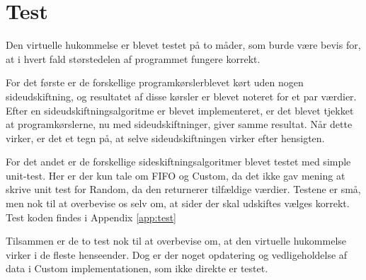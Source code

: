 \section{Test}
Den virtuelle hukommelse er blevet testet på to måder, som burde være bevis for, at i hvert fald størstedelen af programmet fungere korrekt.

For det første er de forskellige programkørslerblevet kørt uden nogen sideudskiftning, og resultatet af disse kørsler er blevet noteret for et par værdier. Efter en sideudskiftningsalgoritme er blevet implementeret, er det blevet tjekket at programkørslerne, nu med sideudskiftninger, giver samme resultat. Når dette virker, er det et tegn på, at selve sideudskiftningen virker efter hensigten.

For det andet er de forskellige sideskiftningsalgoritmer blevet testet med simple unit-test. Her er der kun tale om FIFO og Custom, da det ikke gav mening at skrive unit test for Random, da den returnerer tilfældige værdier. Testene er små, men nok til at overbevise os selv om, at sider der skal udskiftes vælges korrekt. Test koden findes i Appendix \ref{app:test}

Tilsammen er de to test nok til at overbevise om, at den virtuelle hukommelse virker i de fleste henseender. Dog er der noget opdatering og vedligeholdelse af data i Custom implementationen, som ikke direkte er testet.